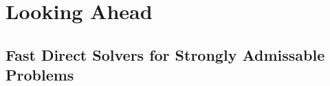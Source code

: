 \chapter{Looking Ahead}\label{chpt:3}


\section{Fast Direct Solvers for Strongly Admissable Problems}\label{sec:3_1}


% 

% 
